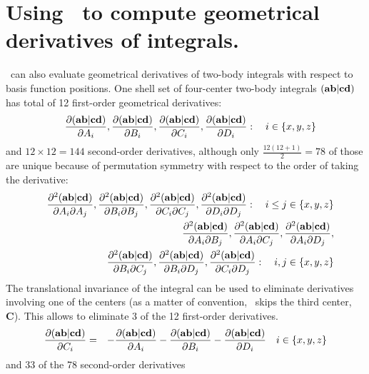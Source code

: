 \documentclass[10pt]{article}
\begin{document}
\section{Using \LIBINT\ to compute geometrical derivatives of integrals.}
\LIBINT\ can also evaluate geometrical derivatives of two-body integrals with respect to basis function positions.
One shell set of four-center two-body integrals $({\bf ab}|{\bf cd})$ has total of 12 first-order geometrical derivatives:
\begin{eqnarray}
& & \frac{\partial ({\bf ab}|{\bf cd})}{\partial A_i}, \frac{\partial ({\bf ab}|{\bf cd})}{\partial B_i},
\frac{\partial ({\bf ab}|{\bf cd})}{\partial C_i},
\frac{\partial ({\bf ab}|{\bf cd})}{\partial D_i} :\quad i \in \{x,y,z\} \nonumber
\end{eqnarray}
and $12\times12=144$ second-order derivatives, although only $\frac{12 (12+1)}{2}=78$ of those are unique because of
permutation symmetry with respect to the order of taking the derivative:
\begin{eqnarray}
& & \frac{\partial^2 ({\bf ab}|{\bf cd})}{\partial A_i \partial A_j}, \frac{\partial^2 ({\bf ab}|{\bf cd})}{\partial B_i \partial B_j},
\frac{\partial^2 ({\bf ab}|{\bf cd})}{\partial C_i \partial C_j}, \frac{\partial^2 ({\bf ab}|{\bf cd})}{\partial D_i \partial D_j} :\quad
i \leq j \in \{x,y,z\} \nonumber \\
& & \frac{\partial^2 ({\bf ab}|{\bf cd})}{\partial A_i \partial B_j}, \frac{\partial^2 ({\bf ab}|{\bf cd})}{\partial A_i \partial C_j},
\frac{\partial^2 ({\bf ab}|{\bf cd})}{\partial A_i \partial D_j}, \nonumber \\
& & \frac{\partial^2 ({\bf ab}|{\bf cd})}{\partial B_i \partial C_j}, \frac{\partial^2 ({\bf ab}|{\bf cd})}{\partial B_i \partial D_j},
\frac{\partial^2 ({\bf ab}|{\bf cd})}{\partial C_i \partial D_j} : \quad i,j \in \{x,y,z\} \nonumber
\end{eqnarray}
The translational invariance of the integral can be used to eliminate derivatives involving one of the centers (as a matter of convention, \LIBINT\ skips the third center, {\bf C}). This allows to eliminate 3 of the 12 first-order derivatives.
\begin{eqnarray} \label{eqn:TId1eri}
\frac{\partial ({\bf ab}|{\bf cd})}{\partial C_i} & = & - \frac{\partial ({\bf ab}|{\bf cd})}{\partial A_i} -
\frac{\partial ({\bf ab}|{\bf cd})}{\partial B_i} - \frac{\partial ({\bf ab}|{\bf cd})}{\partial D_i} \quad i \in \{x,y,z\}
\end{eqnarray}
and
33 of the 78 second-order derivatives
\end{document}
